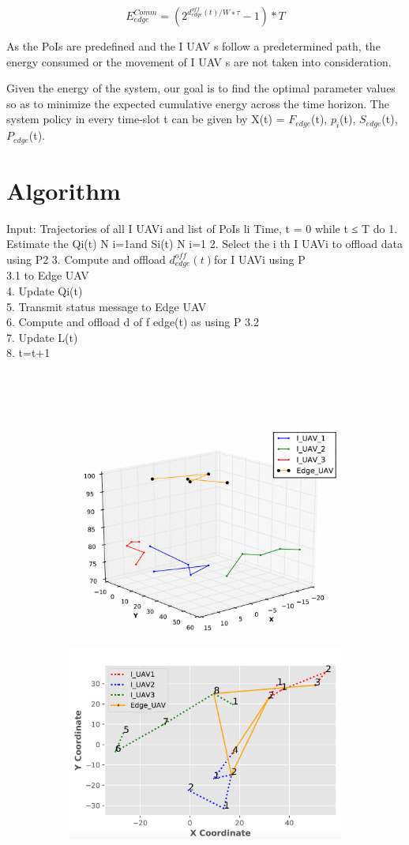 \documentclass[11pt,twocolumn]{article}
\begin{document}
\begin{equation}
    E_{edge}^{Comm}= (2^{d_{edge}^{off}(t)/W∗τ} - 1)*T
\end{equation}

As the PoIs are predefined and the I UAV s follow a predetermined path, the energy consumed or the movement of I UAV s are not taken into consideration.\cite{sharrif2011aloe}

Given the energy of the system, our goal is to find the optimal parameter values so as to minimize the expected cumulative energy across the time horizon. The system policy in every time-slot t can be given by X(t) ={ $F_{edge}$(t), $p_{i}$(t), $S_{edge}$(t), $P_{edge}$(t)}. 

\section{Algorithm}

Input: Trajectories of all I UAVi and list of PoIs li
Time, t = 0
while t ≤ T do
1. Estimate the {Qi(t)} N i=1and {Si(t)} N i=1
2. Select the i th I UAVi to offload data using P2
3. Compute and offload ${d_{edge}^{off}(t)}$for I UAVi using P 
\\3.1 to Edge UAV \\
4. Update Qi(t) \\
5. Transmit status message to Edge UAV\\
6. Compute and offload d of f edge(t) as using P 3.2 \\
7. Update L(t)\\
8. t=t+1

\\\\
\begin{figure}
\centering
\begin{subfigure}{.5\textwidth}
  \centering
  \includegraphics[width=.4\linewidth]{fig1.png}
  \label{fig:sub1}
\end{subfigure}%
\begin{subfigure}{.5\textwidth}
  \centering
  \includegraphics[width=.4\linewidth]{fig2.png}
  \label{fig:sub2}
\end{subfigure}
\label{fig:test}
\end{figure}
\end{document}
